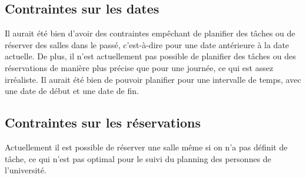 \subsection{Contraintes sur les dates}
Il aurait été bien d'avoir des contraintes empêchant de planifier des tâches ou de réserver des salles dans le passé, c'est-à-dire pour une date antérieure à la date actuelle. De plus, il n'est actuellement pas possible de planifier des tâches ou des réservations de manière plus précise que pour une journée, ce qui est assez irréaliste. Il aurait été bien de pouvoir planifier pour une intervalle de temps, avec une date de début et une date de fin. 

\subsection{Contraintes sur les réservations}
Actuellement il est possible de réserver une salle même si on n'a pas définit de tâche, ce qui n'est pas optimal pour le suivi du planning des personnes de l'université.